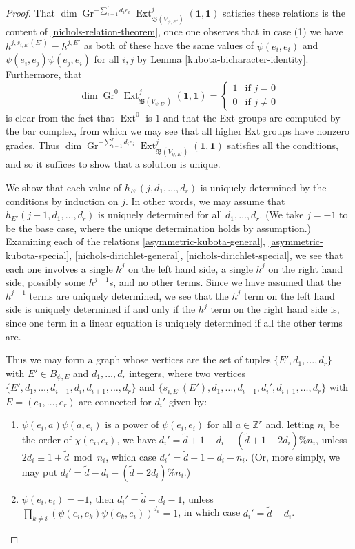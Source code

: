 \documentclass[11pt,letterpaper]{article}
\theoremstyle{definition}
\theoremstyle{remark}
\numberwithin{equation}{section}
\theoremstyle{dotless}
\newcommand{\Gr}{\operatorname{Gr}}
\newcommand{\hchi}{\psi} %
\renewcommand{\tilde}{\widetilde}
\begin{document}
\begin{proof} That $\dim \Gr^{ -\sum_{i=1}^r d_i e_i}  \operatorname{Ext}^{j } _{ \mathfrak B( V_{\hchi,E'} )} (\mathbf 1, \mathbf 1)$ satisfies these relations is the content of \eqref{nichols-relation-theorem}, once one observes that in case (1) we have $h^{j,s_{i,E'}(E')} = h^{j, E'}$ as both of these have the same values of $\hchi(e_i,e_i)$ and $\hchi(e_i,e_j)\hchi(e_j,e_i)$ for all $i,j$ by Lemma \ref{kubota-bicharacter-identity}. Furthermore, that \[\dim \Gr^{ 0}  \operatorname{Ext}^{j } _{ \mathfrak B( V_{\hchi,E'} )} (\mathbf 1, \mathbf 1) = \begin{cases} 1 & \textrm{if } j=0 \\ 0 & \textrm{if } j \neq 0 \end{cases}\] is clear from the fact that $\operatorname{Ext}^0$ is $1$ and that the Ext groups are computed by the bar complex, from which we may see that all higher Ext groups have nonzero grades. Thus $\dim \Gr^{ -\sum_{i=1}^r d_i e_i}  \operatorname{Ext}^{j } _{ \mathfrak B( V_{\hchi,E'} )} (\mathbf 1, \mathbf 1)$ satisfies all the conditions, and so it suffices to show that a solution is unique. 

We show that each value of $h_{E'}(j,d_1,\dots, d_r)$ is uniquely determined by the conditions by induction on $j$. In other words, we may assume that $h_{E'}(j-1,d_1,\dots, d_r)$ is uniquely determined for all $d_1,\dots,d_r$. (We take $j=-1$ to be the base case, where the unique determination holds by assumption.) Examining each of the relations \eqref{asymmetric-kubota-general}, \eqref{asymmetric-kubota-special}, \eqref{nichols-dirichlet-general}, \eqref{nichols-dirichlet-special}, we see that each one involves a single $h^j$ on the left hand side, a single $h^j$ on the right hand side, possibly some $h^{j-1}$s, and no other terms. Since we have assumed that the $h^{j-1}$ terms are uniquely determined, we see that the $h^j$ term on the left hand side is uniquely determined if and only if the $h^j$ term on the right hand side is, since one term in a linear equation is uniquely determined if all the other terms are.

Thus we may form a graph whose vertices are the set of tuples $\{ E', d_1,\dots,d_r\}$ with $E'\in B_{\hchi,E}$ and $d_1,\dots, d_r$ integers, where two vertices $\{ E', d_1,\dots,d_{i-1},d_i,d_{i+1},\dots,d_r\}$ and $\{ s_{i,E'}(E'),d_1,\dots,d_{i-1}, d_i',d_{i+1},\dots,d_r \}$ with $E = (e_1,\dots,e_r)$ are connected for $d_i'$ given by:
\begin{enumerate}
    \item $\hchi(e_i,a)\hchi(a,e_i)$ is a power of $\hchi(e_i,e_i)$ for all $a\in \mathbb Z^r$ and, letting $n_i$ be the order of $\chi(e_i,e_i)$, we have $d_i' =\tilde{d}+1-d_i -(\tilde{d}+1-2d_i) \%n_i $, unless $2d_i \equiv 1 + \tilde{d}\bmod n_i$, which case $d_i'= \tilde{d}+1-d_i - n_i$. (Or, more simply, we may put $d_i' = \tilde{d}-d_i - (\tilde{d}-2d_i)\% n_i$.)
    \item $\hchi(e_i,e_i)=-1$, then $d_i'= \tilde{d}-d_i-1$, unless $\prod_{k\neq i} (\hchi(e_i,e_k) \hchi(e_k,e_i))^{d_k}=1$, in which case $d_i' = \tilde{d}-d_i$.
\end{enumerate}


\end{proof}
\end{document}
